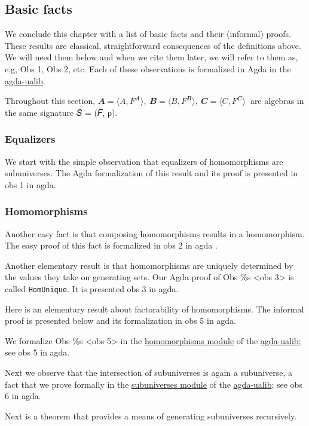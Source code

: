 \documentclass[sigplan,screen]{acmart}
\newcommand{\agdaualib}{\href{https://ualib.org}{agda-ualib}\xspace}
\newcommand\homomorphismsmodule{\href{https://gitlab.com/ualib/ualib.gitlab.io/-/blob/master/homomorphisms.lagda.rst}{homomorphisms module}\xspace}
\newcommand\subuniversesmodule{\href{https://gitlab.com/ualib/ualib.gitlab.io/-/blob/master/subuniverses.lagda.rst}{subuniverses module}\xspace}
\begin{document}
\subsection{Basic facts}\label{basic-facts}
We conclude this chapter with a list of basic facts and their (informal) proofs. These results are classical, straightforward consequences of the definitions above. We will need them below and when we cite them later, we will refer to them as, e.g, Obs 1, Obs 2, etc. Each of these observations is formalized in Agda in the \agdaualib.

Throughout this section, \(𝑨 = ⟨A, F^{𝑨}⟩, \ 𝑩 = ⟨B, F^{𝑩}⟩, \ 𝑪 = ⟨C, F^{𝑪}⟩\ \) are algebras in the same signature 𝑆 = (𝐹, ρ).

\subsubsection{Equalizers}\label{equalizers}
We start with the simple observation that equalizers of homomorphisms are subuniverses. The Agda formalization of this result and its proof is presented in obs 1 in agda.

\subsubsection{Homomorphisms}\label{homomorphisms-1}
Another easy fact is that composing homomorphisms results in a homomorphism. The easy proof of this fact is formalized in obs 2 in agda .

Another elementary result is that homomorphisms are uniquely determined by the values they take on generating sets. Our Agda proof of Obs \%s \textless{}obs 3\textgreater{} is called
\texttt{HomUnique}. It is presented obs 3 in agda.


Here is an elementary result about factorability of homomorphisms. The informal proof is presented below and its formalization in obs 5 in agda.

We formalize Obs \%s \textless{}obs 5\textgreater{} in the \homomorphismsmodule of the \agdaualib; see obs 5 in agda.

Next we observe that the intersection of subuniverses is again a subuniverse, a fact that we prove formally in the \subuniversesmodule of the \agdaualib; see obs 6 in agda.

Next is a theorem that provides a means of generating subuniverses recursively.
\end{document}
